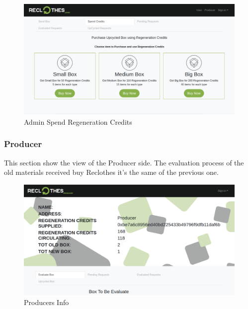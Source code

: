 \begin{figure}[h!]
    \centering
    \includegraphics[totalheight=7.5cm]{img/dapp/adminp-buy.png}
    \caption{Admin Spend Regeneration Credits}
    \label{fig:adminp-buy}
\end{figure}

\newpage
\subsubsection{Producer}

This section show the view of the Producer side. The evaluation process of the old materials
received buy Reclothes it's the same of the previous one.

\begin{figure}[h!]
    \centering
    \includegraphics[totalheight=7.5cm]{img/dapp/producer-info.png}
    \caption{Producers Info}
    \label{fig:producer-info}
\end{figure}

